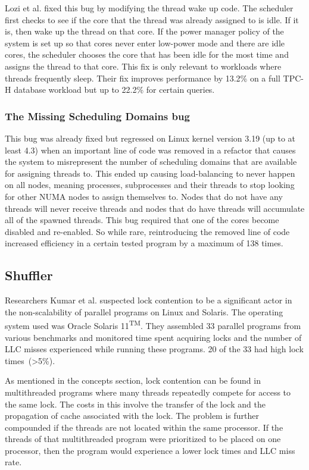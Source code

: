 \documentclass{sig-alternate}
\begin{document}
Lozi et al. fixed this bug by modifying the thread wake up code. The scheduler first checks to see if the core that the thread was already assigned to is idle. If it is, then wake up the thread on that core. If the power manager policy of the system is set up so that cores never enter low-power mode and there are idle cores, the scheduler chooses the core that has been idle for the most time and assigns the thread to that core. This fix is only relevant to workloads where threads frequently sleep. Their fix improves performance by 13.2\% on a full TPC-H database workload but up to 22.2\% for certain queries.~\cite{Lozi:2016}

\subsubsection{The Missing Scheduling Domains bug}
\label{sec:cfsfault_missingsched}

This bug was already fixed but regressed on Linux kernel version 3.19 (up to at least 4.3) when an important line of code was removed in a refactor that causes the system to misrepresent the number of scheduling domains that are available for assigning threads to. This ended up causing load-balancing to never happen on all nodes, meaning processes, subprocesses and their threads to stop looking for other NUMA nodes to assign themselves to. Nodes that do not have any threads will never receive threads and nodes that do have threads will accumulate all of the spawned threads.
This bug required that one of the cores become disabled and re-enabled. So while rare, reintroducing the removed line of code increased efficiency in a certain tested program by a maximum of 138 times.~\cite{Lozi:2016}

\subsection{Shuffler}
\label{sec:shuffler}

Researchers Kumar et al. suspected lock contention to be a significant actor in the non-scalability of parallel programs on Linux and Solaris. The operating system used was Oracle Solaris 11\textsuperscript{TM}. They assembled 33 parallel programs from various benchmarks and monitored time spent acquiring locks and the number of LLC misses experienced while running these programs. 20 of the 33 had high lock times~(>5\%).

As mentioned in the concepts section, lock contention can be found in multithreaded programs where many threads repeatedly compete for access to the same lock. The costs in this involve the transfer of the lock and the propagation of cache associated with the lock. The problem is further compounded if the threads are not located within the same processor. If the threads of that multithreaded program were prioritized to be placed on one processor, then the program would experience a lower lock times and LLC miss rate.
\end{document}
